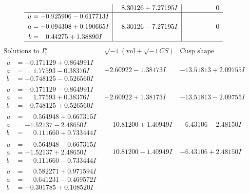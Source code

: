 \documentclass[1p]{elsarticle_modified}
\theoremstyle{definition}
\newcommand{\I}{\sqrt{-1}}
\begin{document}
$$\begin{array}{c|c|c}
 & \phantom{-}8.30126 + 7.27195 I & \phantom{-0.000000 } 0 \\ \hline\begin{aligned}
u &= -0.925906 - 0.617713 I \\
a &= -0.094308 + 0.190665 I \\
b &= \phantom{-}0.44275 + 1.38890 I\end{aligned}
 & \phantom{-}8.30126 - 7.27195 I & \phantom{-0.000000 } 0\\
 \hline 
 \end{array}$$\newpage$$\begin{array}{c|c|c}  
\text{Solutions to }I^u_{1}& \I (\text{vol} + \sqrt{-1}CS) & \text{Cusp shape}\\
 \hline 
\begin{aligned}
u &= -0.171129 + 0.864991 I \\
a &= \phantom{-}1.77593 - 0.38376 I \\
b &= -0.748125 - 0.526560 I\end{aligned}
 & -2.60922 - 1.38173 I & -13.51813 + 2.09755 I \\ \hline\begin{aligned}
u &= -0.171129 - 0.864991 I \\
a &= \phantom{-}1.77593 + 0.38376 I \\
b &= -0.748125 + 0.526560 I\end{aligned}
 & -2.60922 + 1.38173 I & -13.51813 - 2.09755 I \\ \hline\begin{aligned}
u &= \phantom{-}0.564948 + 0.667315 I \\
a &= -1.52137 - 2.48650 I \\
b &= \phantom{-}0.111660 + 0.733444 I\end{aligned}
 & \phantom{-}10.81200 + 1.40949 I & -6.43106 - 2.48150 I \\ \hline\begin{aligned}
u &= \phantom{-}0.564948 - 0.667315 I \\
a &= -1.52137 + 2.48650 I \\
b &= \phantom{-}0.111660 - 0.733444 I\end{aligned}
 & \phantom{-}10.81200 - 1.40949 I & -6.43106 + 2.48150 I \\ \hline\begin{aligned}
u &= \phantom{-}0.582271 + 0.971594 I \\
a &= \phantom{-}0.641231 - 0.469572 I \\
b &= -0.301785 + 0.108520 I\end{aligned}

\end{array}$$
\end{document}
